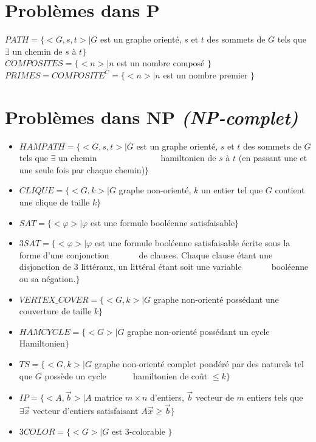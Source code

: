 \documentclass{article}
\begin{document}
\begin{sffamily}
\section*{Problèmes dans P}

\noindent $PATH = \{ <G,s,t> \mid G$ est un graphe orienté, $s$ et $t$ des sommets de $G$ tels que $\exists$ un chemin de $s$ à 
$t \}$ \\
$COMPOSITES = \{ <n> \mid n$ est un nombre composé $\}$ \\
$PRIMES = COMPOSITE^C = \{ <n> \mid n$ est un nombre premier $\}$ \\
\newpage

\section*{Problèmes dans NP \textit{(NP-complet)}}

\begin{itemize}
\item $HAMPATH = \{ <G,s,t> \mid G$ est un graphe orienté, $s$ et $t$ des sommets de $G$ tels que $\exists$ un chemin 
\indent$\qquad\,\,\,\,\,\qquad\qquad$ hamiltonien de $s$ à $t$ (en passant une et une seule fois par chaque chemin)$\}$
\item $CLIQUE = \{ <G,k> \mid G$ graphe non-orienté, $k$ un entier tel que $G$ contient une clique de taille $k\}$
\item $SAT = \{ <\varphi> \mid \varphi$ est une formule booléenne satisfaisable$\}$
\item $3SAT = \{ <\varphi> \mid \varphi$ est une formule booléenne satisfaisable écrite sous la forme d'une conjonction 
\indent$\qquad\,\,\,\,\,$ de clauses. Chaque clause étant une disjonction de 3 littéraux, un littéral étant soit une
variable \indent$\qquad\,\,\,\,\,$ booléenne ou sa négation.$\}$
\item $VERTEX\_COVER = \{ <G,k> \mid G$ graphe non-orienté possédant une couverture de taille $k \}$
\item $HAMCYCLE = \{ <G> \mid G$ graphe non-orienté possédant un cycle Hamiltonien$\}$
\item $TS = \{ <G,k> \mid G$ graphe non-orienté complet pondéré par des naturels tel que $G$ possède un cycle \indent$\qquad\,\,
\,$ hamiltonien de coût $\leq k\}$
\item $IP = \{ <A,\overrightarrow{b}> \mid A$ matrice $m\times n$ d'entiers, $\overrightarrow{b}$ vecteur de $m$ entiers tels 
que $\exists \overrightarrow{x}$ vecteur d'entiers satisfaisant $A\overrightarrow{x} \geq \overrightarrow{b}\}$
\item $3COLOR = \{ <G> | G$ est $3$-colorable $\}$
\end{itemize}

\end{sffamily}
\end{document}
